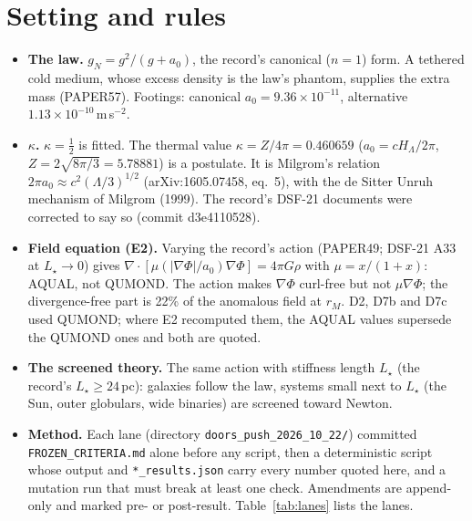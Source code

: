 \documentclass[10pt]{article}
\begin{document}
\section{Setting and rules}
\begin{itemize}
\item \textbf{The law.} $g_N=g^2/(g+a_0)$, the record's canonical ($n=1$) form. A tethered cold medium, whose excess density is the law's phantom, supplies the extra mass (PAPER57). Footings: canonical $a_0=9.36\times10^{-11}$, alternative $1.13\times10^{-10}$\,m\,s$^{-2}$.
\item \textbf{$\kappa$.} $\kappa=\tfrac12$ is fitted. The thermal value $\kappa=Z/4\pi=0.460659$ ($a_0=cH_\Lambda/2\pi$, $Z=2\sqrt{8\pi/3}=5.78881$) is a postulate. It is Milgrom's relation $2\pi a_0\approx c^2(\Lambda/3)^{1/2}$ (arXiv:1605.07458, eq.~5), with the de Sitter Unruh mechanism of Milgrom (1999). The record's DSF-21 documents were corrected to say so (commit d3e4110528).
\item \textbf{Field equation (E2).} Varying the record's action (PAPER49; DSF-21 A33 at $L_\star\to0$) gives $\nabla\cdot[\mu(|\nabla\Phi|/a_0)\nabla\Phi]=4\pi G\rho$ with $\mu=x/(1+x)$: AQUAL, not QUMOND. The action makes $\nabla\Phi$ curl-free but not $\mu\nabla\Phi$; the divergence-free part is 22\% of the anomalous field at $r_M$. D2, D7b and D7c used QUMOND; where E2 recomputed them, the AQUAL values supersede the QUMOND ones and both are quoted.
\item \textbf{The screened theory.} The same action with stiffness length $L_\star$ (the record's $L_\star\ge24$\,pc): galaxies follow the law, systems small next to $L_\star$ (the Sun, outer globulars, wide binaries) are screened toward Newton.
\item \textbf{Method.} Each lane (directory \texttt{doors\_push\_2026\_10\_22/}) committed \texttt{FROZEN\_CRITERIA.md} alone before any script, then a deterministic script whose output and \texttt{*\_results.json} carry every number quoted here, and a mutation run that must break at least one check. Amendments are append-only and marked pre- or post-result. Table~\ref{tab:lanes} lists the lanes.
\end{itemize}
\end{document}
